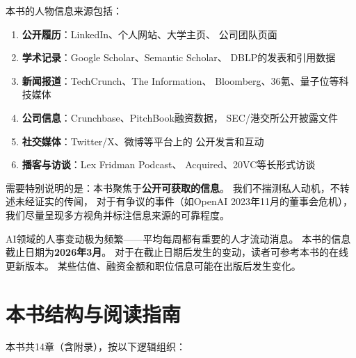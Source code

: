 本书的人物信息来源包括：

\begin{enumerate}
  \item \textbf{公开履历}：LinkedIn、个人网站、大学主页、
    公司团队页面
  \item \textbf{学术记录}：Google Scholar、Semantic Scholar、
    DBLP的发表和引用数据
  \item \textbf{新闻报道}：TechCrunch、The Information、
    Bloomberg、36氪、量子位等科技媒体
  \item \textbf{公司信息}：Crunchbase、PitchBook融资数据，
    SEC/港交所公开披露文件
  \item \textbf{社交媒体}：Twitter/X、微博等平台上的
    公开发言和互动
  \item \textbf{播客与访谈}：Lex Fridman Podcast、
    Acquired、20VC等长形式访谈
\end{enumerate}

需要特别说明的是：本书聚焦于\textbf{公开可获取的信息}。
我们不揣测私人动机，不转述未经证实的传闻，
对于有争议的事件（如OpenAI 2023年11月的董事会危机），
我们尽量呈现多方视角并标注信息来源的可靠程度。

\begin{warnbox}[关于时效性的说明]
AI领域的人事变动极为频繁——平均每周都有重要的人才流动消息。
本书的信息截止日期为\textbf{2026年3月}。
对于在截止日期后发生的变动，读者可参考本书的在线更新版本。
某些估值、融资金额和职位信息可能在出版后发生变化。
\end{warnbox}


\section{本书结构与阅读指南}
\label{sec:overview-structure}

本书共14章（含附录），按以下逻辑组织：

